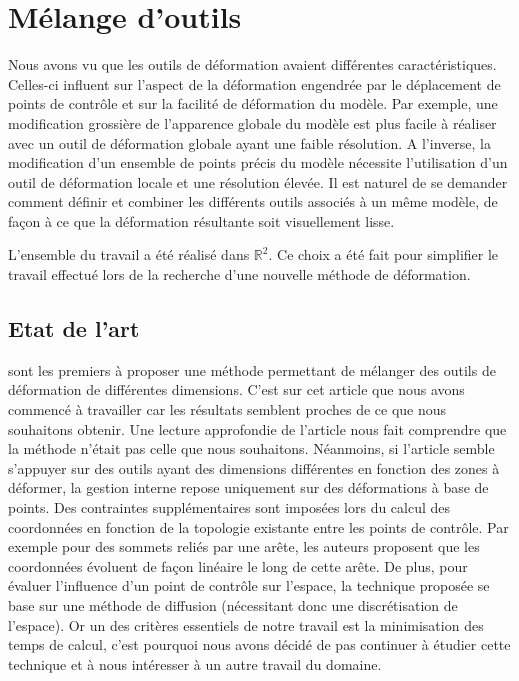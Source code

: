 

\chapter{Mélange d'outils}

\graphicspath{ {Chapter3/Chapter3Figs/PNG/}
  {Chapter3/Chapter3Figs/PDF/} {Chapter3/Chapter3Figs/} }

Nous avons vu que les outils de déformation avaient différentes
caractéristiques. Celles-ci influent sur l'aspect de la déformation engendrée
par le déplacement de points de contrôle et sur la facilité de déformation du
modèle. Par exemple, une modification grossière de l'apparence globale du
modèle est plus facile à réaliser avec un outil de déformation globale ayant
une faible résolution. A l'inverse, la modification d'un ensemble de points
précis du modèle nécessite l'utilisation d'un outil de déformation locale et
une résolution élevée. Il est naturel de se demander comment définir et
combiner les différents outils associés à un même modèle, de façon à ce que la
déformation résultante soit visuellement lisse.

L'ensemble du travail a été réalisé dans $\mathbb{R}^2$. Ce choix a été fait
pour simplifier le travail effectué lors de la recherche d'une nouvelle
méthode de déformation.

\section{Etat de l'art}

\cite{JBPS11} sont les premiers à proposer une méthode permettant de mélanger
des outils de déformation de différentes dimensions. C'est sur cet article que
nous avons commencé à travailler car les résultats semblent proches de ce que
nous souhaitons obtenir. Une lecture approfondie de l'article nous fait
comprendre que la méthode n'était pas celle que nous souhaitons. Néanmoins, si
l'article semble s'appuyer sur des outils ayant des dimensions différentes en
fonction des zones à déformer, la gestion interne repose uniquement sur des
déformations à base de points. Des contraintes supplémentaires sont imposées
lors du calcul des coordonnées en fonction de la topologie existante entre les
points de contrôle. Par exemple pour des sommets reliés par une arête, les
auteurs proposent que les coordonnées évoluent de façon linéaire le long de
cette arête. De plus, pour évaluer l'influence d'un point de contrôle sur
l'espace, la technique proposée se base sur une méthode de diffusion
(nécessitant donc une discrétisation de l'espace). Or un des critères
essentiels de notre travail est la minimisation des temps de calcul, c'est
pourquoi nous avons décidé de pas continuer à étudier cette technique et à
nous intéresser à un autre travail du domaine.

